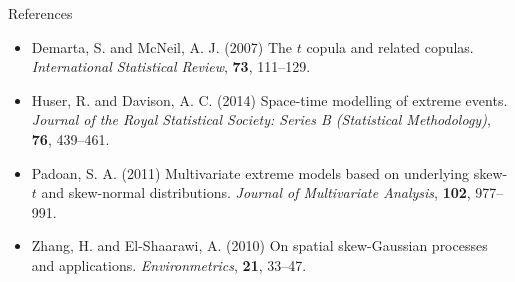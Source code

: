 \documentclass{beamer}
\begin{document}
\begin{frame}{References}
  \begin{itemize} \setlength{\itemsep}{0.5em}
    \item Demarta, S. and McNeil, A. J. (2007) The $t$ copula and related copulas. {\it International Statistical Review}, {\bf 73}, 111--129.
    \item Huser, R. and Davison, A. C. (2014) Space-time modelling of extreme events. {\it Journal of the Royal Statistical Society: Series B (Statistical Methodology)}, {\bf 76}, 439--461.
    \item Padoan, S. A. (2011) Multivariate extreme models based on underlying skew-$t$ and skew-normal distributions. {\it Journal of Multivariate Analysis}, {\bf 102}, 977--991.
    \item Zhang, H. and El-Shaarawi, A. (2010) On spatial skew-Gaussian processes and applications. {\it Environmetrics}, {\bf 21}, 33--47.
  \end{itemize}
\end{frame}
\end{document}
